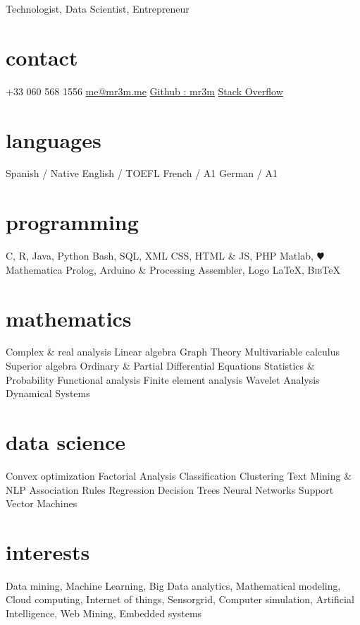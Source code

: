 \documentclass[]{friggeri-cv}
\begin{document}
       {Technologist, Data Scientist, Entrepreneur}


\begin{aside}
  \section{contact}
    +33 060 568 1556
    \href{mailto:me@mr3m.me}{me@mr3m.me}
    \href{https://github.com/mr3m}{Github : mr3m}
    \href{http://stackoverflow.com/cv/mr3m}{Stack Overflow}
  \section{languages}
    Spanish / Native
    English / TOEFL
    French / A1
    German / A1
  \section{	programming}
    C, R, Java, Python
    Bash, SQL, XML
    CSS, HTML \& JS, PHP
    Matlab, {\color{red} $\varheartsuit$} Mathematica
    Prolog, %
    Arduino \& Processing
    Assembler, Logo
    \LaTeX{}, B\textsc{ib}\TeX{}
   \section{mathematics}  
   Complex \& real analysis
   Linear algebra
   Graph Theory
   Multivariable calculus
   Superior algebra
   Ordinary \& Partial Differential Equations
   Statistics \& Probability
   Functional analysis
   Finite element analysis
   Wavelet Analysis
   Dynamical Systems
   \section{data science}
   Convex optimization
   Factorial Analysis
   Classification
   Clustering
   Text Mining \& NLP
   Association Rules
   Regression
   Decision Trees
   Neural Networks
   Support Vector Machines
\end{aside}

\section{interests}

Data mining, Machine Learning, Big Data analytics, Mathematical modeling, Cloud computing, Internet of things, Sensorgrid,  Computer simulation,   Artificial Intelligence, Web Mining, Embedded systems
\end{document}
